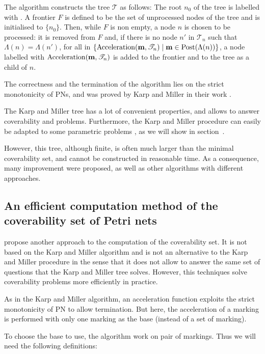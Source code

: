 The algorithm constructs the tree $\mathcal{T}$ as follows:
The root $n_0$ of the tree is labelled with \marqi.
A frontier $F$ is defined to be the set of unprocessed nodes of the tree and is initialised to $\{n_0\}$.
Then, while $F$ is non empty, a node $n$ is chosen to be processed:
it is removed from $F$ and, if there is no node $n'$ in $\mathscr{T}_n$ such that $\Lambda(n) = \Lambda(n')$, for all \omark in $\{\operatorname{Acceleration}(\mathbf{m}, \mathscr{T}_n) \mid \mathbf{m} \in \operatorname{Post}(\Lambda(n))\}$, a node labelled with $\operatorname{Acceleration}(\mathbf{m}, \mathscr{T}_n)$ is added to the frontier and to the tree as a child of $n$.

The correctness and the termination of the algorithm lies on the strict monotonicity of \acp{PN}, and was proved by Karp and Miller in their work \cite{Karp69}.

The Karp and Miller tree has a lot of convenient properties, and allows to answer coverability and \todo{} problems.
Furthermore, the Karp and Miller procedure can easily be adapted to some parametric problems \cite{David17}, as we will show in section~\todo{}.

However, this tree, although finite, is often much larger than the minimal coverability set, and cannot be constructed in reasonable time.
As a consequence, many improvement were proposed, as well as other algorithms with different approaches.

\subsection{An efficient computation method of the coverability set of Petri nets}
\label{sec:eff}

\citep{Geeraerts07thesis, Geeraerts07} propose another approach to the computation of the coverability set.
It is not based on the Karp and Miller algorithm and is not an alternative to the Karp and Miller procedure in the sense that it does not allow to answer the same set of questions that the Karp and Miller tree solves.
However, this techniques solve coverability problems more efficiently in practice.

As in the Karp and Miller algorithm, an acceleration function exploits the strict monotonicity of \ac{PN} to allow termination.
But here, the acceleration of a marking is performed with only one marking as the base (instead of a set of marking).

To choose the base to use, the algorithm work on pair of markings.
Thus we will need the following definitions:



